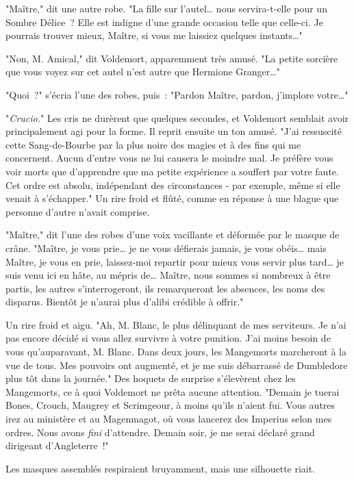 "Maître," dit une autre robe. "La fille sur l'autel… nous servira-t-elle pour un Sombre Délice~? Elle est indigne d'une grande occasion telle que celle-ci. Je pourrais trouver mieux, Maître, si vous me laissiez quelques instants…"

"Non, M. Amical," dit Voldemort, apparemment très amusé. "La petite sorcière que vous voyez sur cet autel n'est autre que Hermione Granger…"

"Quoi~?" s'écria l'une des robes, puis~: "Pardon Maître, pardon, j'implore votre…"

"\emph{Crucio.}" Les cris ne durèrent que quelques secondes, et Voldemort semblait avoir principalement agi pour la forme. Il reprit ensuite un ton amusé. "J'ai ressuscité cette Sang-de-Bourbe par la plus noire des magies et à des fins qui me concernent. Aucun d'entre vous ne lui causera le moindre mal. Je préfère vous voir morts que d'apprendre que ma petite expérience a souffert par votre faute. Cet ordre est absolu, indépendant des circonstances - par exemple, même si elle venait à s'échapper." Un rire froid et flûté, comme en réponse à une blague que personne d'autre n'avait comprise.

"Maître," dit l'une des robes d'une voix vacillante et déformée par le masque de crâne. "Maître, je vous prie… je ne vous défierais jamais, je vous obéis… mais Maître, je vous en prie, laissez-moi repartir pour mieux vous servir plus tard… je suis venu ici en hâte, au mépris de… Maître, nous sommes si nombreux à être partis, les autres s'interrogeront, ils remarqueront les absences, les noms des disparus. Bientôt je n'aurai plus d'alibi crédible à offrir."

Un rire froid et aigu. "Ah, M. Blanc, le plus délinquant de mes serviteurs. Je n'ai pas encore décidé si vous allez survivre à votre punition. J'ai moins besoin de vous qu'auparavant, M. Blanc. Dans deux jours, les Mangemorts marcheront à la vue de tous. Mes pouvoirs ont augmenté, et je me suis débarrassé de Dumbledore plus tôt dans la journée." Des hoquets de surprise s'élevèrent chez les Mangemorts, ce à quoi Voldemort ne prêta aucune attention. "Demain je tuerai Bones, Crouch, Maugrey et Scrimgeour, à moins qu'ils n'aient fui. Vous autres irez au ministère et au Magenmagot, où vous lancerez des Imperius selon mes ordres. Nous avons \emph{fini} d'attendre. Demain soir, je me serai déclaré grand dirigeant d'Angleterre~!"

Les masques assemblés respiraient bruyamment, mais une silhouette riait.

